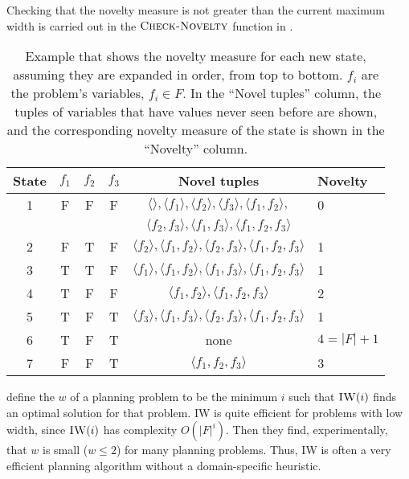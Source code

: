 Checking that the novelty measure is not greater than the current maximum width
is carried out in the $\textsc{Check-Novelty}$ function in
.

\begin{table}[hbtp]
\begin{center}
\newcommand{\tp}[1]{\langle #1 \rangle}
\begin{tabular}{c|ccc|cl}
State & $f_1$ & $f_2$ & $f_3$ & Novel tuples &  Novelty \\
  \hline
  1 & F & F & F & $\tp{},\tp{f_1},\tp{f_2},\tp{f_3},\tp{f_1,f_2},$ & 0\\
  & & & & $\tp{f_2,f_3},\tp{f_1,f_3},\tp{f_1,f_2,f_3}$ & \\
  2 & F & T & F & $\tp{f_2},\tp{f_1,f_2},\tp{f_2,f_3},\tp{f_1,f_2,f_3}$ & 1 \\
  3 & T & T & F & $\tp{f_1},\tp{f_1,f_2},\tp{f_1,f_3},\tp{f_1,f_2,f_3}$ & 1\\
  4 & T & F & F & $\tp{f_1,f_2},\tp{f_1,f_2,f_3}$ & 2\\
  5 & T & F & T & $\tp{f_3},\tp{f_1,f_3},\tp{f_2,f_3},\tp{f_1,f_2,f_3}$ & 1 \\
  6 & T & F & T & none & $4 = |F|+1$ \\
  7 & F & F & T & $\tp{f_1,f_2,f_3}$ & 3 \\
\end{tabular}

\end{center}
\caption[Novelty measure example]{Example that shows the novelty measure for
each new state, assuming they are expanded in order, from top to bottom. $f_i$
are the problem's variables, $f_i\in F$. In the ``Novel tuples'' column, the
tuples of variables that have values never seen before are shown, and the
corresponding novelty measure of the state is shown in the ``Novelty'' column. }
\label{tab:novelty-example}
\end{table}

\citet{lipovetzky2012width} define the  $w$ of a planning
problem to be the minimum $i$ such that $\textsc{IW}(i)$ finds an optimal
solution for that problem. \ac{IW} is quite efficient for problems with low
width, since $\textsc{IW}(i)$ has complexity $O(|F|^i)$. Then they find,
experimentally, that $w$ is small ($w \leq 2$) for many planning problems. Thus,
\ac{IW} is often a very efficient planning algorithm without a domain-specific
heuristic.

